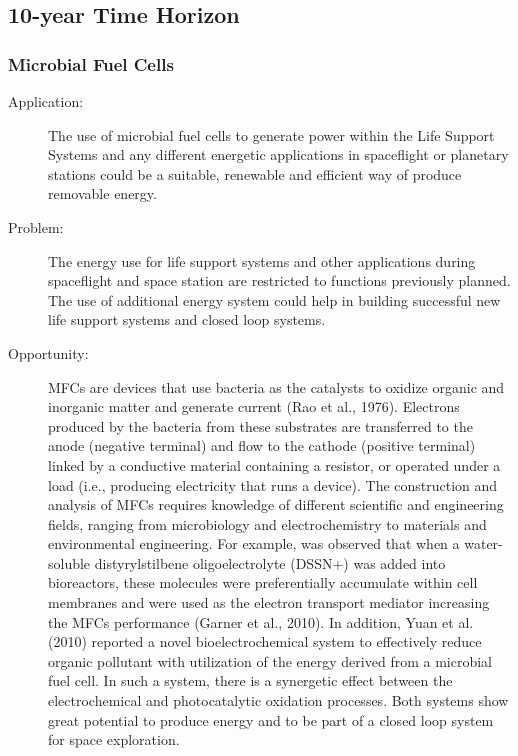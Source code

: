 \documentclass[letter,11pt]{article}
\begin{document}
\secttoc
\renewcommand{\labelenumi}{(\alph{enumi})}

\subsection{10-year Time Horizon}

\subsubsection{Microbial Fuel Cells}

\begin{description}
\item[Application:] The use of microbial fuel cells to generate power within
the Life Support Systems and any different energetic applications in
spaceflight or planetary stations could be a suitable, renewable and
efficient way of produce removable energy.
\item[Problem:] The energy use for life support systems and other
applications during spaceflight and space station are restricted to
functions previously planned. The use of additional energy system
could help in building successful new life support systems and closed
loop systems.
\item[Opportunity:] MFCs are devices that use bacteria as the catalysts to
oxidize organic and inorganic matter and generate current (Rao et al.,
1976). Electrons produced by the bacteria from these substrates are
transferred to the anode (negative terminal) and flow to the cathode
(positive terminal) linked by a conductive material containing a
resistor, or operated under a load (i.e., producing electricity that
runs a device). The construction and analysis of MFCs requires
knowledge of different scientific and engineering fields, ranging from
microbiology and electrochemistry to materials and environmental
engineering. For example, was observed that when a water-soluble
distyrylstilbene oligoelectrolyte (DSSN+) was added into bioreactors,
these molecules were preferentially accumulate within cell membranes
and were used as the electron transport mediator increasing the MFCs
performance (Garner et al., 2010). In addition, Yuan et al. (2010)
reported a novel bioelectrochemical system to effectively reduce
organic pollutant with utilization of the energy derived from a
microbial fuel cell. In such a system, there is a synergetic effect
between the electrochemical and photocatalytic oxidation processes.
Both systems show great potential to produce energy and to be part of
a closed loop system for space exploration.

\end{description}
\end{document}
